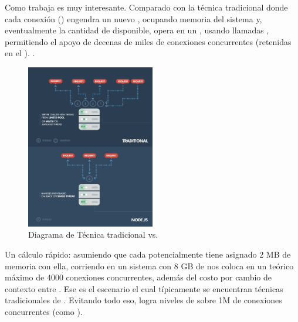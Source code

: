 Como trabaja \underTheHoodCPT es muy interesante. Comparado con la técnica tradicional \webServingINT donde cada conexión (\requestINT) engendra un nuevo \threadPL, ocupando memoria \memoryRamPC del sistema y, eventualmente \maxingOutCPT la cantidad de \memoryRamPC disponible, \nodejsNAME opera en un \singleThreadPL, usando llamadas \nonbloking {}, permitiendo el apoyo de decenas de miles de conexiones concurrentes (retenidas en el \eventloopCPT). .


\begin{figure}[h!]
	\centering
	\includegraphics[width=0.5\textwidth]{figuras/cap2/diagram_traditional_vs_node_serverthread.png}
	\caption{Diagrama de Técnica tradicional vs. \nodejsNAME \serverAS \threadPL}
	\label{figure:diagram_traditional_vs_nodejs_server_thread}
\end{figure}



Un cálculo rápido: asumiendo que cada \threadPL potencialmente tiene asignado 2 MB de memoria con ella, corriendo en un sistema con 8 GB de \memoryRamPC nos coloca en un teórico máximo de 4000 conexiones concurrentes, además del costo por cambio de contexto entre \threadsPL. Ese es el escenario el cual típicamente se encuentran técnicas tradicionales de \webServingINT. Evitando todo eso, \nodejsNAME logra niveles de \scalabilityQA sobre 1M de conexiones concurrentes (como \proofConceptCPT).

